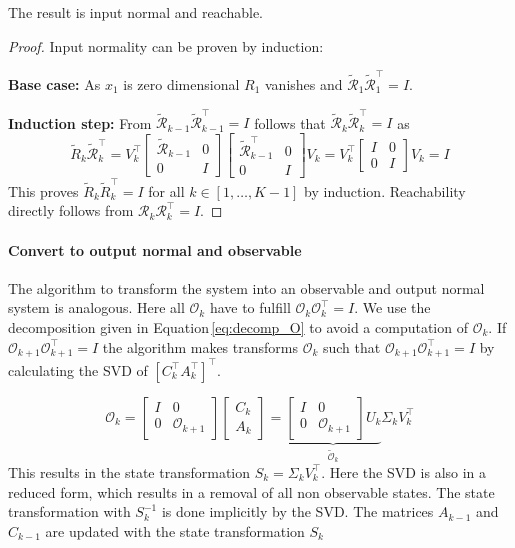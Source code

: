 \documentclass[doctype=mastersthesis,BCOR=15mm,biblatex]{ldvbook}%
\newcommand{\R}{\mathcal{R}} %
\newcommand{\Ob}{\mathcal{O}} %
\newcommand{\eye}{I} %
\begin{document}
The result is input normal and reachable.
\begin{proof}
	Input normality can be proven by induction:
	
	\noindent\textbf{Base case:}
	As $x_1$ is zero dimensional $R_1$ vanishes and 
	$\tilde{\R}_{1}\tilde{\R}_{1}^\top = \eye$.
	
	\noindent\textbf{Induction step:}
	From $\tilde{\R}_{k-1}\tilde{\R}_{k-1}^\top = \eye$ follows that $\tilde{\R}_k\tilde{\R}_k^\top = \eye$ as
	\begin{equation}\label{eq:induction_reach}
	\tilde{R}_k\tilde{\R}_k^\top
	=
	V_k^\top\begin{bmatrix}\tilde{\R}_{k-1} &0\\
		0& \eye \end{bmatrix}
	\begin{bmatrix}\tilde{\R}_{k-1}^\top &0\\
		0& \eye \end{bmatrix} V_k
	= 
	V_k^\top\begin{bmatrix}\eye &0\\
	0& \eye \end{bmatrix} V_k
	=
	\eye
	\end{equation}
	This proves $\tilde{R}_k\tilde{R}_k^\top = \eye$ for all $k \in [1,\dots,K-1]$ by induction.
	Reachability directly follows from $\R_k\R_k^\top = \eye$.
\end{proof}




\paragraph{Convert to output normal and observable}
The algorithm to transform the system into an observable and output normal system is analogous.
Here all $\Ob_k$ have to fulfill $\Ob_{k} \Ob_{k}^\top=\eye$.
We use the decomposition given in Equation\,\ref{eq:decomp_O} to avoid a computation of $\Ob_k$.
If $\Ob_{k+1} \Ob_{k+1}^\top=\eye$ the algorithm makes transforms $\Ob_{k}$ such that $\Ob_{k+1} \Ob_{k+1}^\top=\eye$  by calculating the SVD of $[C_k^\top A_k^\top]^\top$.

\begin{equation}
	\Ob_{k}
	=
	\begin{bmatrix}
	\eye& 0 \\
	0& \Ob_{k+1}
	\end{bmatrix}
	\begin{bmatrix}
	C_k\\
	A_k
	\end{bmatrix}
	=
	\underbrace{
	\begin{bmatrix}
	\eye& 0 \\
	0& \Ob_{k+1}
	\end{bmatrix}
	U_k}_{\tilde{\Ob}_k}
	\Sigma_k V_k^\top
\end{equation}
This results in the state transformation $S_k = \Sigma_k V_k^\top$.
Here the SVD is also in a reduced form, which results in a removal of all non observable states.
The state transformation with $S_k^{-1}$ is done implicitly by the SVD.
The matrices $A_{k-1}$ and $C_{k-1}$ are updated with the state transformation $S_k$
\end{document}
